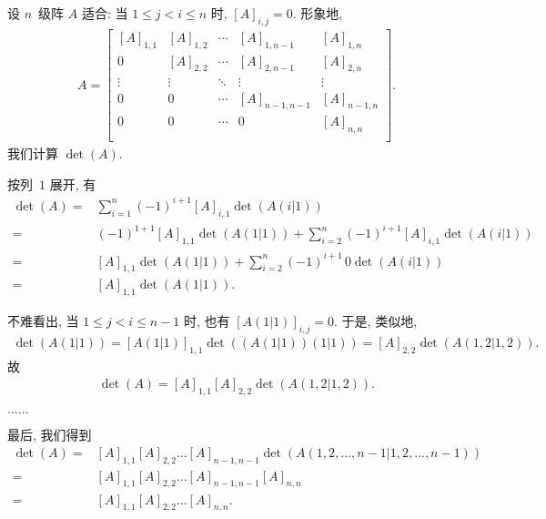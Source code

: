 \begin{example}
    设 \(n\)~级阵 \(A\) 适合:
    当 \(1 \leq j < i \leq n\) 时,
    \([A]_{i,j} = 0\).
    形象地,
    \begin{align*}
        A =
        \begin{bmatrix}
            [A]_{1,1} & [A]_{1,2} & \cdots & [A]_{1,n-1}   & [A]_{1,n}   \\
            0         & [A]_{2,2} & \cdots & [A]_{2,n-1}   & [A]_{2,n}   \\
            \vdots    & \vdots    & \ddots & \vdots        & \vdots      \\
            0         & 0         & \cdots & [A]_{n-1,n-1} & [A]_{n-1,n} \\
            0         & 0         & \cdots & 0             & [A]_{n,n}   \\
        \end{bmatrix}.
    \end{align*}
    我们计算 \(\det {(A)}\).

    按列~\(1\) 展开, 有
    \begin{align*}
        \det {(A)}
        = {} &
        \sum_{i=1}^{n}
        {(-1)^{i+1} [A]_{i,1} \det {(A(i|1))}}
        \\
        = {} &
        (-1)^{1+1} [A]_{1,1} \det {(A(1|1))}
        + \sum_{i=2}^{n}
        {(-1)^{i+1} [A]_{i,1} \det {(A(i|1))}}
        \\
        = {} &
        [A]_{1,1} \det {(A(1|1))}
        + \sum_{i=2}^{n}
        {(-1)^{i+1}\, 0 \det {(A(i|1))}}
        \\
        = {} &
        [A]_{1,1} \det {(A(1|1))}.
    \end{align*}

    不难看出, 当 \(1 \leq j < i \leq n-1\) 时,
    也有 \([A(1|1)]_{i,j} = 0\).
    于是, 类似地,
    \begin{align*}
        \det {(A(1|1))}
        = [A(1|1)]_{1,1} \det {((A(1|1))(1|1))}
            = [A]_{2,2} \det {(A({1,2}|{1,2}))}.
    \end{align*}
    故
    \begin{align*}
        \det {(A)}
        = [A]_{1,1} [A]_{2,2} \det {(A({1,2}|{1,2}))}.
    \end{align*}

    \(\dots \dots\)

    最后, 我们得到
    \begin{align*}
        \det {(A)}
        = {} &
        [A]_{1,1} [A]_{2,2} \dots [A]_{n-1,n-1}
        \det {(A({1,2,\dots,n-1}|{1,2,\dots,n-1}))}
        \\
        = {} &
        [A]_{1,1} [A]_{2,2} \dots [A]_{n-1,n-1} [A]_{n,n}
        \\
        = {} &
        [A]_{1,1} [A]_{2,2} \dots [A]_{n,n}.
    \end{align*}
\end{example}

